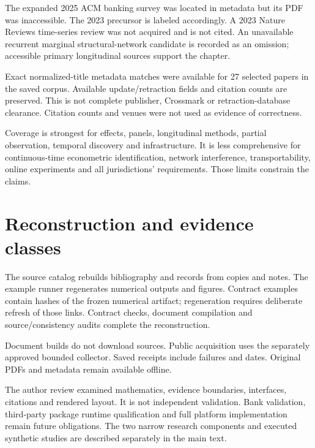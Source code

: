 The expanded 2025 ACM banking survey was located in metadata but its PDF
was inaccessible. The 2023 precursor is labeled accordingly. A 2023
Nature Reviews time-series review was not acquired and is not cited.
An unavailable recurrent marginal structural-network candidate is recorded
as an omission; accessible primary longitudinal sources support the chapter.

Exact normalized-title metadata matches were available for 27 selected
papers in the saved corpus. Available update/retraction fields and citation
counts are preserved. This is not complete publisher, Crossmark or
retraction-database clearance. Citation counts and venues were not used
as evidence of correctness.

Coverage is strongest for effects, panels, longitudinal methods, partial
observation, temporal discovery and infrastructure. It is less comprehensive
for continuous-time econometric identification, network interference,
transportability, online experiments and all jurisdictions' requirements.
Those limits constrain the claims.

\section{Reconstruction and evidence classes}
The source catalog rebuilds bibliography and records from copies and notes.
The example runner regenerates numerical outputs and figures.
Contract examples contain hashes of the frozen numerical artifact;
regeneration requires deliberate refresh of those links.
Contract checks, document compilation and source/consistency audits complete
the reconstruction.

Document builds do not download sources. Public acquisition uses the
separately approved bounded collector. Saved receipts include failures and
dates. Original PDFs and metadata remain available offline.

The author review examined mathematics, evidence boundaries, interfaces,
citations and rendered layout. It is not independent validation.
Bank validation, third-party package runtime qualification and full platform
implementation remain future obligations. The two narrow research components
and executed synthetic studies are described separately in the main text.

